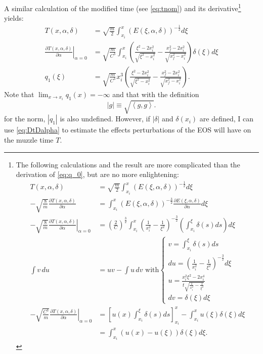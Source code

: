\documentclass[]{article}
\newcommand\inner[2]{\left<#1,#2\right>}
\newcommand\norm[1]{\left|#1\right|}
\newcommand\dum{\xi}
\newcommand\Ddum{d\dum}
\begin{document}
A similar calculation of the modified time (see \eqref{eq:tnom}) and
its derivative\footnote{ The following calculations and the result are
  more complicated than the derivation of \eqref{eq:q_0}, but are no
  more enlightening:
  \begin{align*}
    T(x,\alpha,\delta) &= \sqrt{\frac{m}{2}} \int_{x_i}^x
    \left( E(\dum,\alpha,\delta) \right)^{-\frac{1}{2}} \Ddum \\
    -\sqrt{\frac{8}{m}}\frac{\partial T(x,\alpha,\delta)}{\partial
      \alpha} &=
    \int_{x_i}^x \left( E(\dum,\alpha,\delta) \right)^{-\frac{3}{2}}
    \frac{\partial E(\dum,\alpha,\delta)}{\partial \alpha} \Ddum \\
    -\sqrt{\frac{8}{m}} \left. \frac{\partial
        T(x,\alpha,\delta)}{\partial \alpha} 
    \right|_{\alpha = 0} &=  \left(\frac{2}{C} \right)^{\frac{3}{2}}
    \int_{x_i}^x \left( \frac{1}{x_i^2} - \frac{1}{\dum^2} 
    \right)^{-\frac{3}{2}} \left(\int_{x_i}^\dum \delta(s) ds \right) \Ddum \\
    \int v\,du &= uv - \int u\, dv \text{ with}
    \begin{cases}
      v = \int_{x_i}^\dum \delta(s) ds \\
      du = \left( \frac{1}{x_i^2} - \frac{1}{\dum^2}
      \right)^{-\frac{3}{2}} \Ddum \\
      u = \frac{x_i^2\dum^2 - 2 x_i^4}{t\sqrt{\frac{1}{x_i^2} -
          \frac{1}{\dum^2}}} \\
      dv = \delta(\dum) \Ddum
    \end{cases} \\
    -\sqrt{\frac{C^3}{m}} \left. \frac{\partial
        T(x,\alpha,\delta)}{\partial \alpha} \right|_{\alpha = 0} &=
    \left[ u(x) \int_{x_i}^\dum \delta(s) ds \right]_{x_i}^x - \int_{x_i}^x
    u(\dum) \delta(\dum) \Ddum \\
    &= \int_{x_i}^x \left( u(x) - u(\dum) \right) \delta(\dum) \Ddum.
  \end{align*}
}
yields:
\begin{align}
  T(x,\alpha,\delta) &= \sqrt{\frac{m}{2}} \int_{x_i}^x
  \left( E(\dum,\alpha,\delta) \right)^{-\frac{1}{2}} \Ddum \nonumber \\
  \left. \frac{\partial T(x,\alpha,\delta)}{\partial \alpha}
  \right|_{\alpha = 0} &= \sqrt{ \frac{m}{C^3}} \int_{x_i}^x \left(
  \frac{\dum^2-2x_i^2}{\sqrt{\dum^2 - x_i^2}} -
  \frac{x_f^2-2x_i^2}{\sqrt{x_f^2 - x_i^2}}
  \right) \delta(\dum) \Ddum \nonumber \\
  \label{eq:q_1}
  q_1(\dum) &= \sqrt{\frac{m}{C^3}} x_i^3 \left(
    \frac{\dum^2-2x_i^2}{\sqrt{\dum^2 - x_i^2}} -
    \frac{x_f^2-2x_i^2}{\sqrt{x_f^2 - x_i^2}} \right).
\end{align}
Note that $\lim_{x\rightarrow x_i}q_1(x)=-\infty$ and that with the
definition
\begin{equation}
  \label{def:norm}
  \norm{g} \equiv \sqrt{\inner{g}{g}}.
\end{equation}
for the norm, $\norm{q_1}$ is also undefined.  However, if
$\norm{\delta}$ and $\delta(x_i)$ are defined, I can use
\eqref{eq:DtDalpha} to estimate the effects perturbations of the EOS
will have on the muzzle time $T$.
\end{document}

